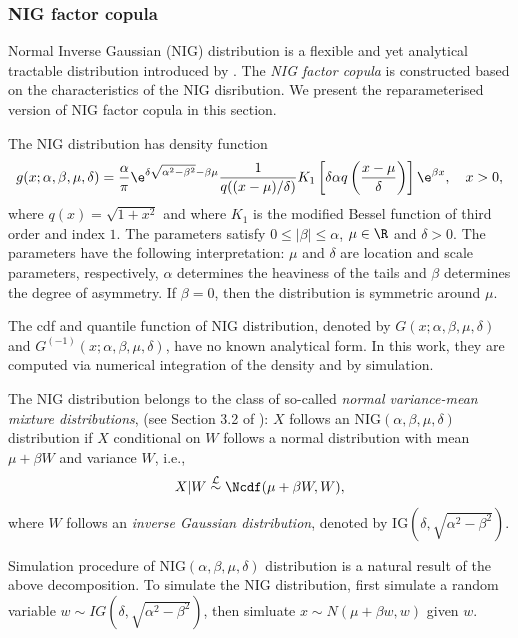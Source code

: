 \subsubsection{NIG factor copula}

Normal Inverse Gaussian (NIG) distribution is a flexible and yet analytical tractable distribution introduced by
\citep{BarndorffNielsen1997}.
The {\em NIG factor copula} is constructed based on the characteristics of the NIG disribution. 
We present the reparameterised version of NIG factor copula in this section.

The NIG distribution has density function
\begin{equation*}
  g(x; \alpha,\beta, \mu, \delta) = \frac{\alpha}{\pi} \e^{\delta
    \sqrt{\alpha^2-\beta^2} -\beta\mu} \frac{1}{q((x-\mu)/\delta)}
  K_1\left[\delta \alpha q\left(\frac{x-\mu}{\delta}\right) \right]
  \e^{\beta x},\quad x>0,
\end{equation*}
where $q(x) = \sqrt{1+x^2}$ and where $K_1$ is the modified Bessel
function of third order and index $1$. The parameters satisfy $0\leq
|\beta|\leq \alpha$, $\mu\in \R$ and $\delta>0$. The parameters have
the following interpretation: $\mu$ and $\delta$ are location and
scale parameters, respectively, $\alpha$ determines the heaviness of
the tails and $\beta$ determines the degree of asymmetry. If
$\beta=0$, then the distribution is symmetric around $\mu$.

The cdf and quantile function of NIG distribution, denoted by $G(x; \alpha, \beta, \mu, \delta)$ and $G^{(-1)}(x; \alpha, \beta, \mu, \delta)$,
 have no known analytical form.
 In this work, they are computed via numerical integration of the density and by simulation.

The NIG distribution belongs to
the class of so-called {\em normal
variance-mean mixture distributions},  (see Section 3.2 of 
\citep{McNeil2005}): $X$ follows an
$\text{NIG}(\alpha,\beta,\mu,\delta)$ distribution if $X$ conditional
on $W$ follows a normal distribution with mean $\mu+\beta W$ and
variance $W$, i.e., 
\begin{equation*}
  X|W\stackrel{\mathcal L}\sim \Ncdf(\mu + \beta W, W),
\end{equation*}
where $W$ follows an {\em inverse Gaussian distribution}, denoted by
$\text{IG}(\delta, \sqrt{\alpha^2-\beta^2})$.

Simulation procedure of NIG$(\alpha, \beta, \mu, \delta)$ distribution is a natural result of the above decomposition. 
To simulate the NIG distribution, first simulate a random variable $w \sim IG(\delta, \sqrt{\alpha^2-\beta^2})$, 
then simluate $x \sim N(\mu+ \beta w, w)$ given $w$.

